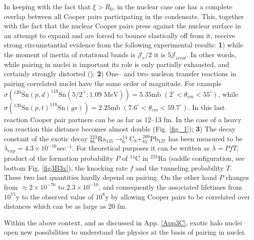 \begin{subappendices}
 
 In keeping with the fact that $\xi>R_0$, in the nuclear case one has a complete overlap between all Cooper pairs participating in the condensate. This, together with the fact that the nuclear Cooper pairs press against the nuclear surface in an attempt to expand and are forced to bounce elastically off from  it, receive strong circumstantial evidence from the following experimental results: \textbf{1}) while the moment of inertia of rotational bands is $\mathcal J_r/2$ it is $5 \mathcal J_{irrot}$. In other words, while pairing in nuclei is important its role is only partially exhausted, and certainly strongly distorted (\cite{Bohr:75}); \textbf{2}) One-- and two--nucleon transfer reactions in pairing correlated nuclei have the same order of magnitude. For example $\sigma (^{120}\text{Sn}(p,d)^{119}\text{Sn}(5/2^+; 1.09 \text{ MeV}))=5.35 $mb $(2^\circ<\theta_{cm}<55^\circ)$, while $\sigma (^{120}\text{Sn}(p,t)^{118}\text{Sn}(gs))=2.25 $mb $(7.6^\circ<\theta_{cm}<59.7^\circ)$. In this last reaction Cooper pair partners can be as far as 12--13 fm. In the case of a heavy ion reaction this distance becomes almost double (Fig. \ref{fig_1}); \textbf{3}) The decay constant of the exotic decay $^{223}_{88}$Ra$_{135}\rightarrow^{14}_6$C$_8+^{209}_{82}$Pb$_{127}$ has been measured to be $\lambda_{exp}=4.3\times10^{-16}$sec$^{-1}$. For theoretical purposes it can be written as $\lambda=PfT$, product of the formation probability $P$ of $^{14}$C in $^{223}$Ra (saddle configuration, see bottom Fig. \ref{fig3B3x}), the knocking rate $f$ and the tunneling probability $T$. These two last quantities hardly depend on pairing. On the other hand $P$ changes from $\approx 2\times10^{-76}$ to $2.3\times10^{-10}$, and consequently the associated lifetimes from $10^{75}$y to the observed value of $10^8$y by allowing Cooper pairs to be correlated over distances which can be as large as 20 fm.
 
 
 Within the above context, and as discussed in App. \ref{App3C}, exotic halo nuclei open new possibilities to understand the physics at the basis of pairing in nuclei.

\end{subappendices}
